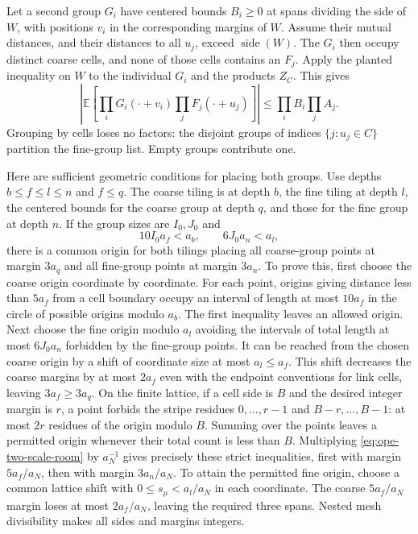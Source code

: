 Let a second group $G_i$ have centered bounds $B_i\geq0$ at spans dividing
the side of $W$, with positions $v_i$ in the corresponding margins of $W$.
Assume their mutual distances, and their distances to all $u_j$, exceed
$\operatorname{side}(W)$. The $G_i$ then occupy distinct coarse cells,
and none of those cells contains an $F_j$. Apply the planted inequality
on $W$ to the individual $G_i$ and the products $Z_C$. This gives
\begin{equation}\label{eq:ope-mixed-plant}
 \left|\mathbb E\left[\prod_iG_i(\cdot+v_i)
                         \prod_jF_j(\cdot+u_j)\right]\right|
                   \leq\prod_iB_i\prod_jA_j.
\end{equation}
Grouping by cells loses no factors: the disjoint groups of indices
$\{j:u_j\in C\}$ partition the fine-group list. Empty groups contribute
one.

Here are sufficient geometric conditions for placing both groups.
Use depths $b\leq f\leq l\leq n$ and $f\leq q$. The coarse tiling is
at depth $b$, the fine tiling at depth $l$, the centered bounds for the
coarse group at depth $q$, and those for the fine group at depth $n$.
If the group sizes are $I_0,J_0$ and
\begin{equation}\label{eq:ope-two-scale-room}
 10I_0a_f<a_b,\qquad 6J_0a_n<a_l,
\end{equation}
there is a common origin for both tilings placing all coarse-group points
at margin $3a_q$ and all fine-group points at margin $3a_n$.
To prove this, first choose the coarse origin coordinate by coordinate.
For each point, origins giving distance less than $5a_f$ from a cell
boundary occupy an interval of length at most $10a_f$ in the circle of
possible origins modulo $a_b$. The first inequality leaves an allowed
origin. Next choose the fine origin modulo $a_l$ avoiding the intervals
of total length at most $6J_0a_n$ forbidden by the fine-group points.
It can be reached from the chosen coarse origin by a shift of coordinate
size at most $a_l\leq a_f$. This shift decreases the coarse margins by
at most $2a_f$ even with the endpoint conventions for link cells, leaving
$3a_f\geq3a_q$. On the finite lattice, if a cell side is $B$ and the desired integer
margin is $r$, a point forbids the stripe residues
$0,\ldots,r-1$ and $B-r,\ldots,B-1$: at most $2r$ residues
of the origin modulo $B$. Summing over the points leaves a permitted
origin whenever their total count is less than $B$. Multiplying
\eqref{eq:ope-two-scale-room} by $a_N^{-1}$ gives precisely these
strict inequalities, first with margin $5a_f/a_N$, then with margin
$3a_n/a_N$. To attain the permitted fine origin, choose a common lattice
shift with $0\leq s_\mu< a_l/a_N$ in each coordinate. The coarse
$5a_f/a_N$ margin loses at most $2a_f/a_N$, leaving the required three
spans. Nested mesh divisibility makes all sides and margins integers.

